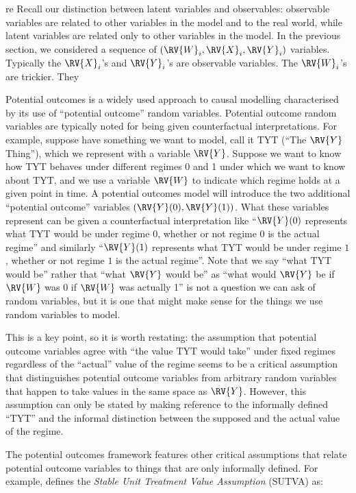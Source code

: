 re
Recall our distinction between latent variables and observables: observable variables are related to other variables in the model and to the real world, while latent variables are related only to other variables in the model. In the previous section, we considered a sequence of $(\RV{W}_i, \RV{X}_i, \RV{Y}_i)$ variables. Typically the $\RV{X}_i$'s and $\RV{Y}_i$'s are observable variables. The $\RV{W}_i$'s are trickier. They 

Potential outcomes is a widely used approach to causal modelling characterised by its use of ``potential outcome'' random variables. Potential outcome random variables are typically noted for being given counterfactual interpretations. For example, suppose have something we want to model, call it TYT (``The $\RV{Y}$ Thing''), which we represent with a variable $\RV{Y}$. Suppose we want to know how TYT behaves under different regimes 0 and 1 under which we want to know about TYT, and we use a variable $\RV{W}$ to indicate which regime holds at a given point in time. A potential outcomes model will introduce the two additional ``potential outcome'' variables $(\RV{Y}(0), \RV{Y}(1))$. What these variables represent can be given a counterfactual interpretation like ``$\RV{Y}(0)$ represents what TYT would be under regime $0$, whether or not regime $0$ is the actual regime'' and similarly ``$\RV{Y}(1)$ represents what TYT would be under regime $1$, whether or not regime $1$ is the actual regime''. Note that we say ``what TYT would be'' rather that ``what $\RV{Y}$ would be'' as ``what would $\RV{Y}$ be if $\RV{W}$ was 0 if $\RV{W}$ was actually 1'' is not a question we can ask of random variables, but it is one that might make sense for the things we use random variables to model.

This is a key point, so it is worth restating: the assumption that potential outcome variables agree with ``the value TYT would take'' under fixed regimes regardless of the ``actual'' value of the regime seems to be a critical assumption that distinguishes potential outcome variables from arbitrary random variables that happen to take values in the same space as $\RV{Y}$. However, this assumption can only be stated by making reference to the informally defined ``TYT'' and the informal distinction between the supposed and the actual value of the regime.

The potential outcomes framework features other critical assumptions that relate potential outcome variables to things that are only informally defined. For example, \citet{rubin_causal_2005} defines the \emph{Stable Unit Treatment Value Assumption} (SUTVA) as:

